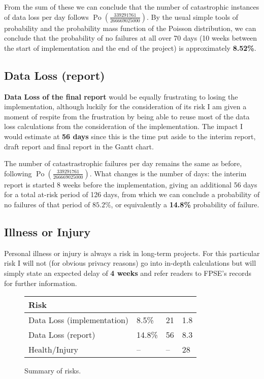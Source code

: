 From the sum of these we can conclude that the number of catastrophic
instances of data loss per day follows $\operatorname{Po}(\frac{339291761}
{266669025000})$. By the usual simple tools of probability and the
probability mass function of the Poisson distribution, we can conclude that
the probability of no failures at all over 70 days (10 weeks between the
start of implementation and the end of the project) is approximately
\textbf{8.52\%}.

\subsection{Data Loss (report)}

\textbf{Data Loss of the final report} would be equally frustrating to
losing the implementation, although luckily for the consideration of its
risk I am given a moment of respite from the frustration by being able to
reuse most of the data loss calculations from the consideration of the
implementation. The impact I would estimate at \textbf{56 days} since this
is the time put aside to the interim report, draft report and final report
in the Gantt chart.

The number of catastrastrophic failures per day remains the same as before,
following $\operatorname{Po}(\frac{339291761}{266669025000})$. What changes
is the number of days: the interim report is started 8 weeks before the
implementation, giving an additional 56 days for a total at-risk period of
126 days, from which we can conclude a probability of no failures of that period
of $85.2\%$, or equivalently a \textbf{14.8\%} probability of failure.

\subsection{Illness or Injury}

Personal illness or injury is always a risk in long-term projects.
For this particular risk I will not (for obvious privacy reasons)
go into in-depth calculations but will simply state an expected
delay of \textbf{4 weeks} and refer readers to FPSE's records for
further information.

\begin{figure}
\begin{tabu} to 0.9\linewidth { X[7,r] | X[c] | X[c] | X[c] }
  \textbf{Risk} &  &
     &  \\
    \hline
    Data Loss (implementation) & 8.5\%
                               & 21
                               & 1.8 \\
    Data Loss (report) & 14.8\%
                       & 56
                       & 8.3 \\
    Health/Injury & --
                  & --
                  & 28
\end{tabu}
\caption{Summary of risks.}
\label{fig:risks}
\end{figure}

